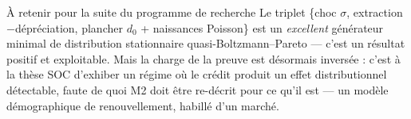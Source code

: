 \documentclass[10pt,a4paper]{article}
\begin{document}
\begin{encadre}[nonrouge]{À retenir pour la suite du programme de recherche}
Le triplet \{choc $\sigma$, extraction$-$dépréciation, plancher $d_0$ +
naissances Poisson\} est un \emph{excellent} générateur minimal de
distribution stationnaire quasi-Boltzmann--Pareto — c'est un résultat
positif et exploitable. Mais la charge de la preuve est désormais inversée :
c'est à la thèse SOC d'exhiber un régime où le crédit produit un effet
distributionnel détectable, faute de quoi M2 doit être re-décrit pour ce
qu'il est — un modèle démographique de renouvellement, habillé d'un marché.
\end{encadre}
\end{document}
